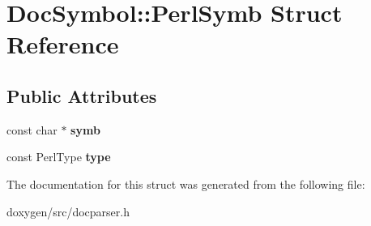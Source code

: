 \hypertarget{struct_doc_symbol_1_1_perl_symb}{}\section{Doc\+Symbol\+::Perl\+Symb Struct Reference}
\label{struct_doc_symbol_1_1_perl_symb}
\subsection*{Public Attributes}
\begin{DoxyCompactItemize}
\item 
\mbox{\label{struct_doc_symbol_1_1_perl_symb_a204d1b219a9e60b0221d0c4a480c2846}} 
const char $\ast$ {\bfseries symb}
\item 
\mbox{\label{struct_doc_symbol_1_1_perl_symb_a31739403a369f6ead5d501ad8ecfdf91}} 
const Perl\+Type {\bfseries type}
\end{DoxyCompactItemize}


The documentation for this struct was generated from the following file\+:\begin{DoxyCompactItemize}
\item 
doxygen/src/docparser.\+h\end{DoxyCompactItemize}
